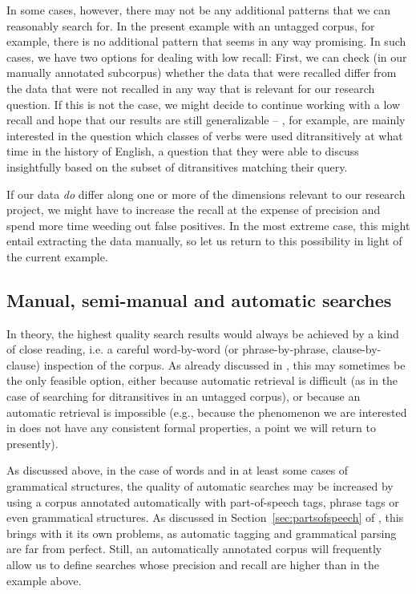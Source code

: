 In some cases, however, there may not be any additional patterns that we can reasonably search for. In the present example with an untagged  corpus, for example, there is no additional pattern that seems in any way promising. In such cases, we have two options for dealing with low recall:  First, we can check (in our manually  annotated  subcorpus) whether the data that were recalled differ from the data that were not recalled in any way that is relevant for our research question. If this is not the case, we might decide to continue working with a low recall and hope that our results are still generalizable -- \citet{colleman_constructional_2011}, for example, are mainly interested in the question which classes of verbs  were used ditransitively  at what time in the history of English, a question that they were able to discuss insightfully based on the subset of ditransitives matching their  query.

If our data \textit{do} differ along one or more of the dimensions relevant to our research project, we might have to increase the recall  at the expense of precision  and spend more time weeding out false positives. In the most extreme case, this might entail extracting  the data manually,  so let us return to this possibility in light of the current example.

\subsection{Manual, semi\hyp{}manual and automatic searches}
\label{sec:searchtypes}

In theory, the highest quality search results would always be achieved by a kind of close reading, i.e. a careful word\hyp{}by\hyp{}word (or phrase\hyp{}by\hyp{}phrase, clause\hyp{}by\hyp{}clause) inspection of the corpus.  As already discussed in , this may sometimes be the only feasible option, either because automatic retrieval  is difficult (as in the case of searching for ditransitives  in an untagged  corpus), or because an automatic retrieval is impossible (e.g., because the phenomenon we are interested in does not have any consistent formal properties, a point we will return to presently).

As discussed above, in the case of words and in at least some cases of grammatical structures, the quality of automatic searches may be increased by using a corpus annotated  automatically with part\hyp{}of\hyp{}speech tags, phrase tags or even grammatical structures. As discussed in Section~\ref{sec:partsofspeech} of , this brings with it its own problems, as automatic tagging  and grammatical parsing are far from perfect. Still, an automatically annotated  corpus will frequently allow us to define searches whose precision  and recall  are higher than in the example above.

